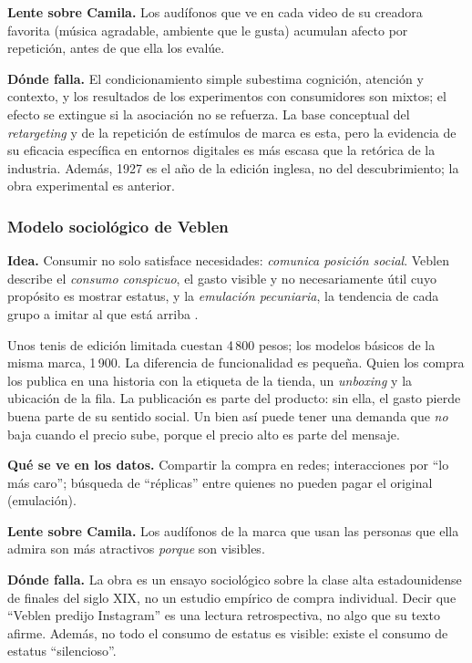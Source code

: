 \textbf{Lente sobre Camila.} Los audífonos que ve en cada video de su creadora
favorita (música agradable, ambiente que le gusta) acumulan afecto por
repetición, antes de que ella los evalúe.

\textbf{Dónde falla.} El condicionamiento simple subestima cognición, atención y
contexto, y los resultados de los experimentos con consumidores son mixtos; el
efecto se extingue si la asociación no se refuerza. La base conceptual
del \textit{retargeting} y de la repetición de estímulos de marca es esta,
pero la evidencia de su eficacia específica en entornos digitales es más
escasa que la retórica de la industria. Además, 1927 es el año de la edición
inglesa, no del descubrimiento; la obra experimental es anterior.

\subsubsection{Modelo sociológico de Veblen}
\label{sec:cap09-veblen}

\textbf{Idea.} Consumir no solo satisface necesidades: \emph{comunica posición
social}. Veblen describe el \emph{consumo conspicuo}, el gasto visible y no
necesariamente útil cuyo propósito es mostrar estatus, y la
\emph{emulación pecuniaria}, la tendencia de cada grupo a imitar al que está
arriba \parencite{veblen1899}.

\begin{cajaEjemplo}[title={Ejemplo: la edición limitada que se muestra}]
Unos tenis de edición limitada cuestan 4\,800 pesos; los modelos básicos de la
misma marca, 1\,900. La diferencia de funcionalidad es pequeña. Quien los compra los
publica en una historia con la etiqueta de la tienda, un \textit{unboxing} y la
ubicación de la fila. La publicación es parte del producto: sin ella, el
gasto pierde buena parte de su sentido social. Un bien así puede tener una
demanda que \emph{no} baja cuando el precio sube, porque el precio alto es parte
del mensaje.

\textbf{Qué se ve en los datos.} Compartir la compra en redes; interacciones
por \enquote{lo más caro}; búsqueda de \enquote{réplicas} entre quienes no
pueden pagar el original (emulación).
\end{cajaEjemplo}

\textbf{Lente sobre Camila.} Los audífonos de la marca que usan las
personas que ella admira son más atractivos \emph{porque} son visibles.

\textbf{Dónde falla.} La obra es un ensayo sociológico sobre la clase alta
estadounidense de finales del siglo XIX, no un estudio empírico de compra
individual. Decir que \enquote{Veblen predijo Instagram} es una lectura
retrospectiva, no algo que su texto afirme. Además, no todo el consumo de
estatus es visible: existe el consumo de estatus \enquote{silencioso}.

